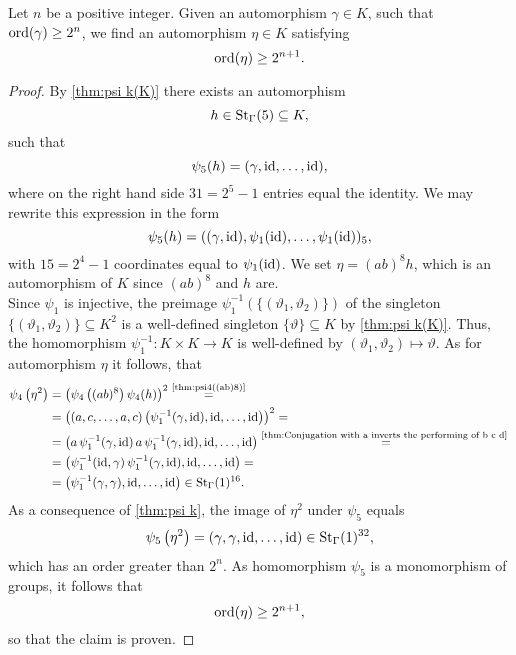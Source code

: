 \begin{lem}\label{thm:Inductive Step Infinite Growth}
Let $n$ be a positive integer. Given an automorphism $\gamma\in K$, such that $\ord(\gamma)\geq 2^n$, we find an automorphism $\eta\in K$ satisfying
\begin{equation*}
\ord(\eta)\geq 2^{n+1}. 
\end{equation*}
\end{lem}
\begin{proof}
By \cref{thm:psi k(K)} there exists an automorphism 
\begin{equation*}
h\in\St[\Gamma]{5}\subseteq K,
\end{equation*}
 such that
\begin{equation*}
\psi_5(h)=(\gamma,\id,\ldots,\id),
\end{equation*}
where on the right hand side $31=2^5-1$ entries equal the identity. We may rewrite this expression in the form
\begin{equation*}
\psi_5(h)=((\gamma,\id),\psi_1(\id),\ldots,\psi_1(\id))_5,
\end{equation*}
with $15=2^4-1$ coordinates equal to $\psi_1(\id)$. We set $\eta=(ab)^8h$, which is an automorphism of $K$ since $(ab)^8$ and $h$ are.\\

Since $\psi_1$ is injective, the preimage $\psi_1^{-1}(\lbrace(\vartheta_1,\vartheta_2)\rbrace)$ of the sing\-le\-ton $\lbrace(\vartheta_1,\vartheta_2)\rbrace\subseteq K^2$ is a well-defined singleton $\lbrace\vartheta\rbrace\subseteq K$ by \cref{thm:psi k(K)}. Thus, the homomorphism $\psi_1^{-1}\colon K\times K\to K$ is well-defined by $(\vartheta_1,\vartheta_2)\mapsto\vartheta$. As for automorphism $\eta$ it follows, that
\begin{align*}
\psi_4\left(\eta^2\right)	&=\left(\psi_4\left((ab)^8\right)\psi_4(h)\right)^2\overset{\text{\cref{thm:psi4((ab)8)}}}{=}\\
				&=\left((a,c,\ldots,a,c)\left(\psi_1^{-1}(\gamma,\id),\id,\ldots,\id\right)\right)^2=\\
				&=\left(a\,\psi_1^{-1}(\gamma,\id)\,a\,\psi_1^{-1}(\gamma,\id),\id,\ldots,\id\right)\overset{\text{\cref{thm:Conjugation with a inverts the performing of b c d} }}{=}\\
				&=\left(\psi_1^{-1}(\id,\gamma)\,\psi_1^{-1}(\gamma,\id),\id,\ldots,\id\right)=\\
				&=\left(\psi_1^{-1}(\gamma,\gamma),\id,\ldots,\id\right)\in\St[\Gamma]{1}^{16}.
\end{align*}
As a consequence of \cref{thm:psi k}, the  image of $\eta^2$ under $\psi_5$ equals
\begin{equation*}
\psi_5\left(\eta^2\right)=(\gamma,\gamma,\id,\ldots,\id)\in\St[\Gamma]{1}^{32},
\end{equation*}
which has an order greater than $2^n$. As homomorphism $\psi_5$ is a monomorphism of groups, it follows that
\begin{equation*}
\ord(\eta)\geq 2^{n+1},
\end{equation*}
so that the claim is proven.
\end{proof}

